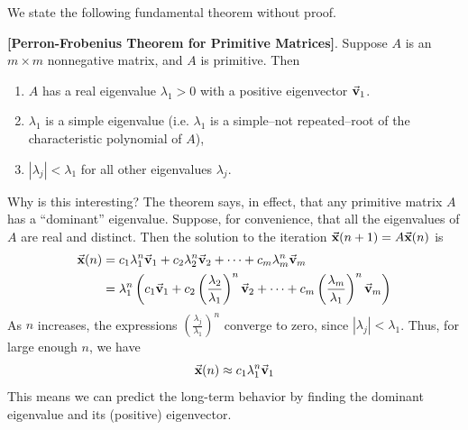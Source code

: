 We state the following fundamental theorem without
proof.
\begin{theorem}
\textrm{\textbf{[Perron-Frobenius Theorem for Primitive Matrices]}}.
Suppose $A$ is an $m\times m$ nonnegative matrix, and $A$ is primitive.
Then
\begin{enumerate}
\item $A$ has a real eigenvalue $\lambda_1>0$ with 
a positive eigenvector $\vec{\textbf{v}}_1$.
\item $\lambda_1$ is a simple eigenvalue
(i.e. $\lambda_1$ is a simple--not repeated--root
of the characteristic polynomial of $A$),
\item $|\lambda_j| < \lambda_1$ for all other eigenvalues
$\lambda_j$.
\end{enumerate}
\end{theorem}

% 

Why is this interesting?  The theorem says, in effect,
that any primitive matrix $A$ has a ``dominant'' eigenvalue.
Suppose, for
convenience, that all the eigenvalues of $A$ are real
and distinct.  Then the solution to the iteration
$\vec{\textbf{x}}(n+1) = A\vec{\textbf{x}}(n)$ is
\begin{equation}
\begin{split}
  \vec{\textbf{x}}(n) & = c_1 \lambda_1^n \vec{\textbf{v}}_1 + c_2 \lambda_2^n \vec{\textbf{v}}_2
                 + \cdots + c_m \lambda_m^n \vec{\textbf{v}}_m \\
           & = \lambda_1^n \left( c_1 \vec{\textbf{v}}_1 
	      + c_2 \left(\frac{\lambda_2}{\lambda_1}\right)^n \vec{\textbf{v}}_2
                 + \cdots 
              + c_m \left(\frac{\lambda_m}{\lambda_1}\right)^n \vec{\textbf{v}}_m \right) \\
\end{split} 
\end{equation}
As $n$ increases, the expressions
$\left(\frac{\lambda_j}{\lambda_1}\right)^n$
converge to zero, since $|\lambda_j| < \lambda_1$.
Thus, for large enough $n$, we have
\begin{equation}
   \vec{\textbf{x}}(n) \approx c_1 \lambda_1^n \vec{\textbf{v}}_1
\end{equation}
This means we can predict the long-term behavior
by finding the dominant eigenvalue and its (positive)
eigenvector.

